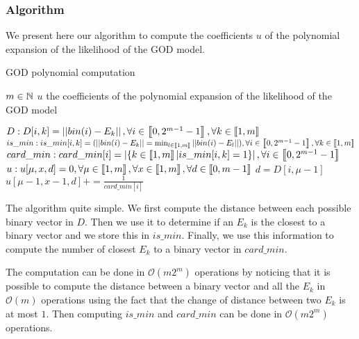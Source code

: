 \subsubsection{Algorithm}

\label{sec:god_polynomial_computation}

We present here our algorithm to compute the coefficients $u$ of the polynomial expansion of the likelihood of the GOD model. 


\begin{algorithm}[H]
    \caption{GOD polynomial computation}
    \begin{algorithmic}[1]
    \Require $m \in \mathbb{N}$
    \Ensure $u$ the coefficients of the polynomial expansion of the likelihood of the GOD model  
        
    \State $D : D[i, k] = \left|\left|bin(i) - E_k\right|\right|, \forall i \in \left\llbracket0, 2^{m - 1} - 1\right\rrbracket, \forall k \in \left\llbracket1, m\right\rrbracket$
    \State $is\_min : is\_min[i, k] = (\left|\left|bin(i) - E_k\right|\right| = \min_{l \in \left\llbracket1, m\right\rrbracket} \left|\left|bin(i) - E_l\right|\right|), \forall i \in \left\llbracket0, 2^{m - 1} - 1\right\rrbracket, \forall k \in \left\llbracket1, m\right\rrbracket$
    \State $card\_min : card\_min[i] = \left|\left\{ k \in \left\llbracket1, m\right\rrbracket | is\_min[i, k] = 1 \right\}\right|, \forall i \in \left\llbracket0, 2^{m - 1} - 1\right\rrbracket$
    \State $u : u[\mu, x, d] = 0, \forall \mu \in \left\llbracket1, m\right\rrbracket, \forall x \in \left\llbracket1, m\right\rrbracket, \forall d \in \left\llbracket0, m - 1\right\rrbracket$
                    \State $d = D[i, \mu - 1]$
                    \State $u[\mu - 1, x - 1, d] += \frac{1}{card\_min[i]}$  
                \EndFor
            \EndIf    
        \EndFor
    \EndFor    
\end{algorithmic}
\end{algorithm}

The algorithm quite simple. We first compute the distance between each possible binary vector in $D$. Then we use it to determine if an $E_k$ is the closest to a binary vector and we store this in $is\_min$. Finally, we use this information to compute the number of closest $E_k$ to a binary vector in $card\_min$. 

The computation can be done in $\mathcal O(m 2^m)$ operations by noticing that it is possible to compute the distance between a binary vector and all the $E_k$ in $\mathcal O(m)$ operations using the fact that the change of distance between two $E_k$ is at most $1$. Then computing $is\_min$ and $card\_min$ can be done in $\mathcal O(m 2^m)$ operations.

